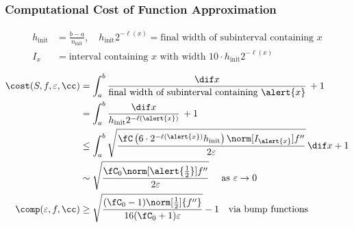 \documentclass[12pt,compress,xcolor={usenames,dvipsnames}]{beamer} %
\DeclareMathOperator{\init}{init}
\newcommand{\abstol}{\varepsilon}
\begin{document}
\begin{frame}
	\frametitle{Computational Cost of Function Approximation}
	\vspace{-6.5ex}
	\begin{align*}
	h_{\init}  &= \frac{b-a}{n_{\init}},  \quad  h_{\init} 2^{-\ell(x)} = \text{final width of subinterval containing } x \\
	 I_{x}& =\text{interval containing $x$ with width } 10 \cdot h_{\init} 2^{-\ell(x)} \\
\end{align*}
\vspace{-6ex}
\begin{align*}
	\cost(S,f,\varepsilon,\cc) 
		&= \int_a^b \frac{\dif x}{\text{final width of subinterval containing } \alert{x}} \,  + 1\\
		&= \int_a^b \frac{\dif x}{h_{\init} 2^{-\ell(\alert{x})}} \,  + 1\\
	&\le \int_a^b \sqrt{\frac{\fC\left(6\cdot 2^{-\ell(\alert{x})} h_{\init}\right) \norm[I_{\alert{x}}]{f''} }{2 \abstol}}  \, \dif x + 1\\
	& \sim \sqrt{\frac{\fC_0 \norm[\alert{\frac 12}]{f''}}{2\abstol}}  \quad \text{ as } \varepsilon \to 0 \\
	\comp(\varepsilon,f,\cc) &\ge \sqrt{\frac{(\fC_0-1)  \norm[\frac12]{f''} }{16(\fC_0+1)\varepsilon}} -1 \quad \text{via bump functions}
	\end{align*}
\end{frame}
\end{document}
